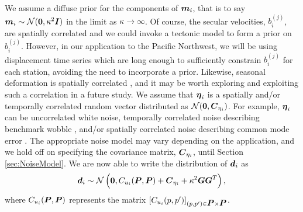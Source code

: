 \documentclass[extra,mreferee]{gji}
\begin{document}
We assume a diffuse prior for the components of $\mitbf{m}_i$, that is
to say $\mitbf{m}_i \sim \mathcal{N}(\zeros,\kappa^2\eye)$ in the
limit as $\kappa \to \infty$. Of course, the secular velocities,
$b_i^{(j)}$, are spatially correlated and we could invoke a tectonic
model to form a prior on $b_i^{(j)}$. However, in our application to
the Pacific Northwest, we will be using displacement time series which
are long enough to sufficiently constrain $b_i^{(j)}$ for each
station, avoiding the need to incorporate a prior. Likewise, seasonal
deformation is spatially correlated \citep{Dong2002,Langbein2008}, and
it may be worth exploring and exploiting such a correlation in a
future study. We assume that $\mitbf{\eta}_i$ is a spatially and/or
temporally correlated random vector distributed as
$\mathcal{N}(\zeros,\mitbf{C}_{\eta_i})$. For example,
$\mitbf{\eta}_i$ can be uncorrelated white noise, temporally
correlated noise describing benchmark wobble
\citep[e.g.,][]{Wyatt1982,Wyatt1989}, and/or spatially correlated
noise describing common mode error \citep[e.g.,][]{Wdowinski1997}. The
appropriate noise model may vary depending on the application, and we
hold off on specifying the covariance matrix, $\mitbf{C}_{\eta_i}$,
until Section \ref{sec:NoiseModel}. We are now able to write the
distribution of $\data_i$ as
\begin{equation}\label{eq:DataDist}
\data_i \sim \mathcal{N}\left(\zeros, C_{u_i}(\points,\points) + 
                                      \mitbf{C}_{\eta_i}  + 
                                      \kappa^2\G\G^T \right),
\end{equation}
where $C_{u_i}(\points,\points)$ represents the matrix
$[C_{u_i}(p,p')]_{(p,p') \in \points \times \points}$.
\end{document}
